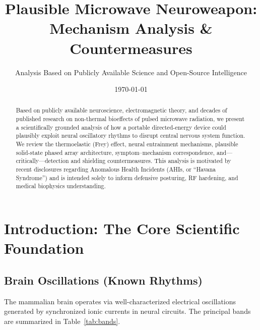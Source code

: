 \documentclass[aps,prl,twocolumn,superscriptaddress,showpacs]{revtex4-2}
\begin{document}
\title{Plausible Microwave Neuroweapon: Mechanism Analysis \& Countermeasures}

\author{Analysis Based on Publicly Available Science and Open-Source Intelligence}

\date{\today}

\begin{abstract}
Based on publicly available neuroscience, electromagnetic theory, and decades
of published research on non-thermal bioeffects of pulsed microwave radiation,
we present a scientifically grounded analysis of how a portable directed-energy
device could plausibly exploit neural oscillatory rhythms to disrupt central
nervous system function. We review the thermoelastic (Frey) effect, neural
entrainment mechanisms, plausible solid-state phased array architecture,
symptom--mechanism correspondence, and---critically---detection and shielding
countermeasures. This analysis is motivated by recent disclosures regarding
Anomalous Health Incidents (AHIs, or ``Havana Syndrome'') and is intended solely
to inform defensive posturing, RF hardening, and medical biophysics understanding.
\end{abstract}

\maketitle

\section{Introduction: The Core Scientific Foundation}
\label{sec:foundation}

\subsection{Brain Oscillations (Known Rhythms)}

The mammalian brain operates via well-characterized electrical oscillations
generated by synchronized ionic currents in neural circuits. The principal
bands are summarized in Table~\ref{tab:bands}.
\end{document}
